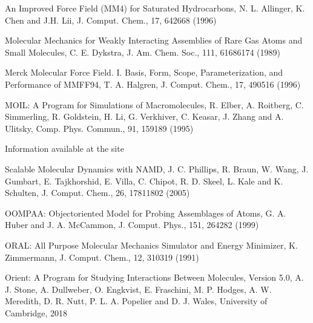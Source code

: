 \documentclass[letterpaper,11pt,english]{sphinxmanual}
\begin{document}
\sphinxAtStartPar
An Improved Force Field (MM4) for Saturated Hydrocarbons, N. L. Allinger, K. Chen and J.\sphinxhyphen{}H. Lii, J. Comput. Chem., 17, 642\sphinxhyphen{}668 (1996)

\sphinxAtStartPar
{}

\sphinxAtStartPar
Molecular Mechanics for Weakly Interacting Assemblies of Rare Gas Atoms and Small Molecules, C. E. Dykstra, J. Am. Chem. Soc., 111, 6168\sphinxhyphen{}6174 (1989)

\sphinxAtStartPar
{}

\sphinxAtStartPar
Merck Molecular Force Field. I. Basis, Form, Scope, Parameterization, and Performance of MMFF94, T. A. Halgren, J. Comput. Chem., 17, 490\sphinxhyphen{}516 (1996)

\sphinxAtStartPar
{}

\sphinxAtStartPar
MOIL: A Program for Simulations of Macromolecules, R. Elber, A. Roitberg, C. Simmerling, R. Goldstein, H. Li, G. Verkhiver, C. Keasar, J. Zhang and A. Ulitsky, Comp. Phys. Commun., 91, 159\sphinxhyphen{}189 (1995)

\sphinxAtStartPar
{}

\sphinxAtStartPar
Information available at the site 

\sphinxAtStartPar
{}

\sphinxAtStartPar
Scalable Molecular Dynamics with NAMD, J. C. Phillips, R. Braun, W. Wang, J. Gumbart, E. Tajkhorshid, E. Villa, C. Chipot, R. D. Skeel, L. Kale and K. Schulten, J. Comput. Chem., 26, 1781\sphinxhyphen{}1802 (2005)

\sphinxAtStartPar
{}

\sphinxAtStartPar
OOMPAA: Object\sphinxhyphen{}oriented Model for Probing Assemblages of Atoms, G. A. Huber and J. A. McCammon, J. Comput. Phys., 151, 264\sphinxhyphen{}282 (1999)

\sphinxAtStartPar
{}

\sphinxAtStartPar
ORAL: All Purpose Molecular Mechanics Simulator and Energy Minimizer, K. Zimmermann, J. Comput. Chem., 12, 310\sphinxhyphen{}319 (1991)

\sphinxAtStartPar
{}

\sphinxAtStartPar
Orient: A Program for Studying Interactions Between Molecules, Version 5.0, A. J. Stone, A. Dullweber, O. Engkvist, E. Fraschini, M. P. Hodges, A. W. Meredith, D. R. Nutt, P. L. A. Popelier and D. J. Wales, University of Cambridge, 2018
\end{document}
